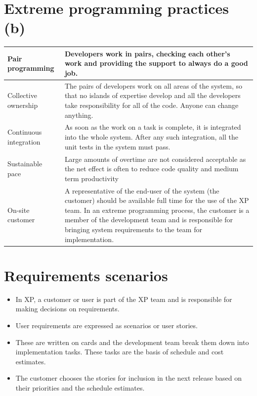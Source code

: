 \section{ Extreme programming practices (b)}

\begin{table}[h!]
\centering
\begin{tabular}{ |p{3cm}|p{8cm}|  }
\hline
Pair programming & Developers work in pairs, checking each other’s work and providing the support to always do a good job.\\
\hline
Collective ownership & The pairs of developers work on all areas of the system, so that no islands of expertise develop and all the developers take responsibility for all of the code. Anyone can change anything.\\
\hline
Continuous integration & As soon as the work on a task is complete, it is integrated into the whole system. After any such integration, all the unit tests in the system must pass.\\
\hline
Sustainable pace & Large amounts of overtime are not considered acceptable as the net effect is often to reduce code quality and medium term productivity\\
\hline
On-site customer & A representative of the end-user of the system (the customer) should be available full time for the use of the XP team. In an extreme programming process, the customer is a member of the development team and is responsible for bringing system requirements to the team for implementation.\\
\hline
\end{tabular}

\label{table:T2_3}
\end{table}

\section{ Requirements scenarios}
\begin{itemize}

\item In XP, a customer or user is part of the XP team and is responsible for making decisions on requirements.

\item User requirements are expressed as scenarios or user stories.

\item These are written on cards and the development team break them down into implementation tasks. These tasks are the basis of schedule and cost estimates.

\item The customer chooses the stories for inclusion in the next release based on their priorities and the schedule estimates.

\end{itemize}
